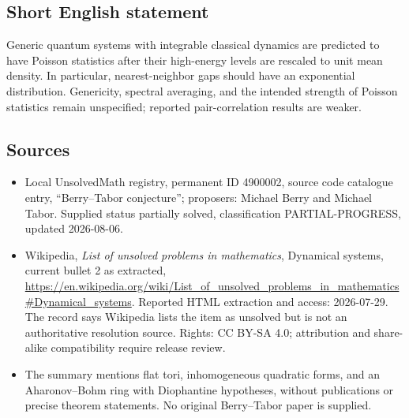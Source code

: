 \documentclass[11pt]{article}
\begin{document}
\subsection{Short English statement}
Generic quantum systems with integrable classical dynamics are predicted to have Poisson statistics after their high-energy levels are rescaled to unit mean density. In particular, nearest-neighbor gaps should have an exponential distribution. Genericity, spectral averaging, and the intended strength of Poisson statistics remain unspecified; reported pair-correlation results are weaker.
\subsection{Sources}
\begin{itemize}
\item Local UnsolvedMath registry, permanent ID 4900002, source code catalogue entry, ``Berry--Tabor conjecture''; proposers: Michael Berry and Michael Tabor. Supplied status partially solved, classification PARTIAL-PROGRESS, updated 2026-08-06.
\item Wikipedia, \emph{List of unsolved problems in mathematics}, Dynamical systems, current bullet 2 as extracted, \url{https://en.wikipedia.org/wiki/List_of_unsolved_problems_in_mathematics#Dynamical_systems}. Reported HTML extraction and access: 2026-07-29. The record says Wikipedia lists the item as unsolved but is not an authoritative resolution source. Rights: CC BY-SA 4.0; attribution and share-alike compatibility require release review.
\item The summary mentions flat tori, inhomogeneous quadratic forms, and an Aharonov--Bohm ring with Diophantine hypotheses, without publications or precise theorem statements. No original Berry--Tabor paper is supplied.
\end{itemize}
\end{document}
